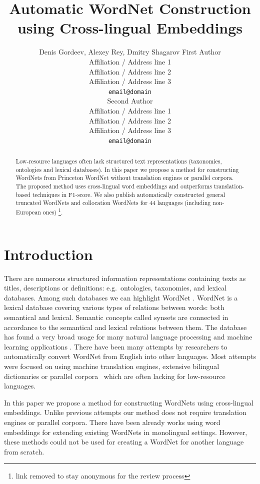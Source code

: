 \documentclass[11pt,a4paper]{article}
\title{Automatic WordNet Construction using Cross-lingual Embeddings}
\author{Denis Gordeev, Alexey Rey, Dmitry Shagarov
	First Author \\
  Affiliation / Address line 1 \\
  Affiliation / Address line 2 \\
  Affiliation / Address line 3 \\
  \texttt{email@domain} \\\And
  Second Author \\
  Affiliation / Address line 1 \\
  Affiliation / Address line 2 \\
  Affiliation / Address line 3 \\
  \texttt{email@domain} \\}
\date{}
\begin{document}
\maketitle
\begin{abstract}
Low-resource languages often lack structured text representations (taxonomies, ontologies and lexical databases). In this paper we propose a method for constructing WordNets from Princeton WordNet without translation engines or parallel corpora. The proposed method uses cross-lingual word embeddings and outperforms translation-based techniques in F1-score. We also publish automatically constructed general truncated WordNets and collocation WordNets for 44 languages (including non-European ones) \footnote{link removed to stay anonymous for the review process}.
\end{abstract}

\section{Introduction}

There are numerous structured information representations containing texts as titles, descriptions or definitions: e.g.\ ontologies, taxonomies, and lexical databases. Among such databases we can highlight WordNet \cite{wordnet}. WordNet is a lexical database covering various types of relations between words: both semantical and lexical. Semantic concepts called synsets are connected in accordance to the semantical and lexical relations between them. The database has found a very broad usage for many natural language processing and machine learning applications \cite{kutuzovgraphwordnet,mao-semeval}.
There have been many attempts by researchers to automatically convert WordNet from English into other languages. Most attempts were focused on using machine translation engines, extensive bilingual dictionaries or parallel corpora~\cite{Khodak2017,NEALE18.1030} which are often lacking for low-resource languages.

In this paper we propose a method for constructing WordNets using cross-lingual embeddings. Unlike previous attempts our method does not require translation engines or parallel corpora. There have been already works using word embeddings for extending existing WordNets \cite{sand2017wordnet,tarouti} in monolingual settings. However, these methods could not be used for creating a WordNet for another language from scratch.
\end{document}
